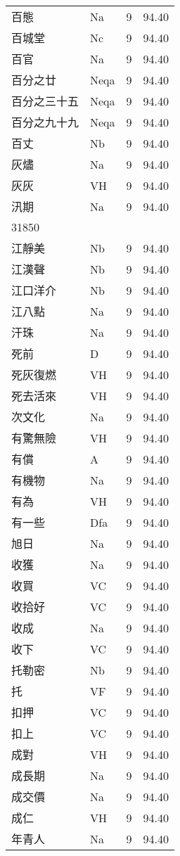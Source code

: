 \documentclass[twocolumn]{book}
\begin{document}
\begin{supertabular}{llrr}
百態 & Na & 9 &  94.40\\
百城堂 & Nc & 9 &  94.40\\
百官 & Na & 9 &  94.40\\
百分之廿 & Neqa & 9 &  94.40\\
百分之三十五 & Neqa & 9 &  94.40\\
百分之九十九 & Neqa & 9 &  94.40\\
百丈 & Nb & 9 &  94.40\\
灰燼 & Na & 9 &  94.40\\
灰灰 & VH & 9 &  94.40\\
汛期 & Na & 9 &  94.40\\
31850\\
江靜美 & Nb & 9 &  94.40\\
江漢聲 & Nb & 9 &  94.40\\
江口洋介 & Nb & 9 &  94.40\\
江八點 & Na & 9 &  94.40\\
汗珠 & Na & 9 &  94.40\\
死前 & D & 9 &  94.40\\
死灰復燃 & VH & 9 &  94.40\\
死去活來 & VH & 9 &  94.40\\
次文化 & Na & 9 &  94.40\\
有驚無險 & VH & 9 &  94.40\\
有償 & A & 9 &  94.40\\
有機物 & Na & 9 &  94.40\\
有為 & VH & 9 &  94.40\\
有一些 & Dfa & 9 &  94.40\\
旭日 & Na & 9 &  94.40\\
收獲 & Na & 9 &  94.40\\
收買 & VC & 9 &  94.40\\
收拾好 & VC & 9 &  94.40\\
收成 & Na & 9 &  94.40\\
收下 & VC & 9 &  94.40\\
托勒密 & Nb & 9 &  94.40\\
托 & VF & 9 &  94.40\\
扣押 & VC & 9 &  94.40\\
扣上 & VC & 9 &  94.40\\
成對 & VH & 9 &  94.40\\
成長期 & Na & 9 &  94.40\\
成交價 & Na & 9 &  94.40\\
成仁 & VH & 9 &  94.40\\
年青人 & Na & 9 &  94.40\\

\end{supertabular}
\end{document}
